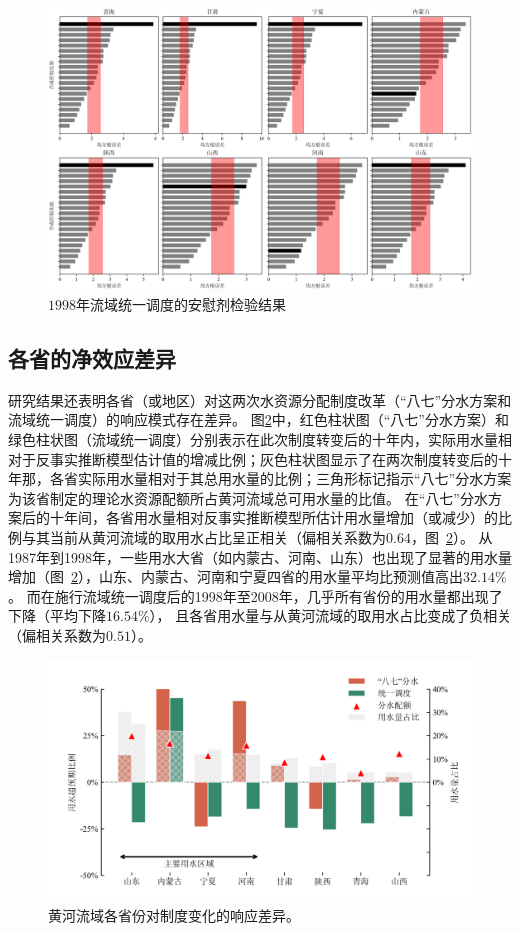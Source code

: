 \begin{figure}
    \includegraphics[width=0.9\linewidth]{img/ch5/ch5_rmse_98.png}
    \centering
    \caption{$1998$年流域统一调度的安慰剂检验结果}\label{fig:98placebo}
\end{figure}


\subsection{各省的净效应差异}\label{result-3}

研究结果还表明各省（或地区）对这两次水资源分配制度改革（“八七”分水方案和流域统一调度）的响应模式存在差异。
图\ref{fig:regulating}中，红色柱状图（“八七”分水方案）和绿色柱状图（流域统一调度）分别表示在此次制度转变后的十年内，实际用水量相对于反事实推断模型估计值的增减比例；灰色柱状图显示了在两次制度转变后的十年那，各省实际用水量相对于其总用水量的比例；三角形标记指示“八七”分水方案为该省制定的理论水资源配额所占黄河流域总可用水量的比值。
在“八七”分水方案后的十年间，各省用水量相对反事实推断模型所估计用水量增加（或减少）的比例与其当前从黄河流域的取用水占比呈正相关（偏相关系数为$0.64$，图~\ref{fig:regulating}）。
从1987年到1998年，一些用水大省（如内蒙古、河南、山东）也出现了显著的用水量增加（图~\ref{fig:regulating}），山东、内蒙古、河南和宁夏四省的用水量平均比预测值高出$32.14\%$。
而在施行流域统一调度后的1998年至2008年，几乎所有省份的用水量都出现了下降（平均下降$16.54\%$），
且各省用水量与从黄河流域的取用水占比变成了负相关（偏相关系数为$0.51$）。

\begin{figure}[!htb]
	\includegraphics[width=\textwidth]{img/ch5/fig3.png}
	\caption[黄河流域各省份对制度变化的响应差异]{黄河流域各省份对制度变化的响应差异。}\label{fig:regulating}
\end{figure}

